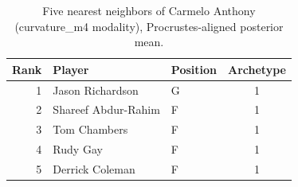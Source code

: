 \begin{table}[htbp]
  \centering\small
  \begin{tabular}{rllc}
    \toprule
    Rank & Player & Position & Archetype \\
    \midrule
    1 & Jason Richardson & G & 1 \\
    2 & Shareef Abdur-Rahim & F & 1 \\
    3 & Tom Chambers & F & 1 \\
    4 & Rudy Gay & F & 1 \\
    5 & Derrick Coleman & F & 1 \\
    \bottomrule
  \end{tabular}
  \caption{Five nearest neighbors of Carmelo Anthony (curvature_m4 modality), Procrustes-aligned posterior mean.}
  \label{tab:Carmelo_Anthony_neighbors_curvature_m4}
\end{table}

